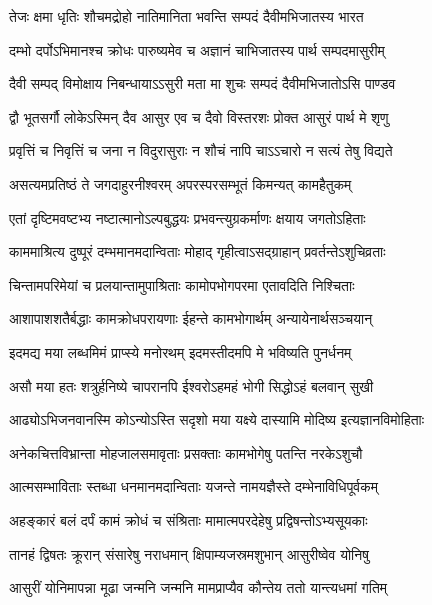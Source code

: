 \twolineshloka
{तेजः क्षमा धृतिः शौचमद्रोहो नातिमानिता}
{भवन्ति सम्पदं दैवीमभिजातस्य भारत}%

\twolineshloka
{दम्भो दर्पोऽभिमानश्च क्रोधः पारुष्यमेव च}
{अज्ञानं चाभिजातस्य पार्थ सम्पदमासुरीम्}%

\twolineshloka
{दैवी सम्पद् विमोक्षाय निबन्धायाऽऽसुरी मता}
{मा शुचः सम्पदं दैवीमभिजातोऽसि पाण्डव}%

\twolineshloka
{द्वौ भूतसर्गौ लोकेऽस्मिन् दैव आसुर एव च}
{दैवो विस्तरशः प्रोक्त आसुरं पार्थ मे शृणु}%

\twolineshloka
{प्रवृत्तिं च निवृत्तिं च जना न विदुरासुराः}
{न शौचं नापि चाऽऽचारो न सत्यं तेषु विद्यते}%

\twolineshloka
{असत्यमप्रतिष्ठं ते जगदाहुरनीश्वरम्}
{अपरस्परसम्भूतं किमन्यत् कामहैतुकम्}%

\twolineshloka
{एतां दृष्टिमवष्टभ्य नष्टात्मानोऽल्पबुद्धयः}
{प्रभवन्त्युग्रकर्माणः क्षयाय जगतोऽहिताः}%

\twolineshloka
{काममाश्रित्य दुष्पूरं दम्भमानमदान्विताः}
{मोहाद् गृहीत्वाऽसद्ग्राहान् प्रवर्तन्तेऽशुचिव्रताः}%

\twolineshloka
{चिन्तामपरिमेयां च प्रलयान्तामुपाश्रिताः}
{कामोपभोगपरमा एतावदिति निश्चिताः}%

\twolineshloka
{आशापाशशतैर्बद्धाः कामक्रोधपरायणाः}
{ईहन्ते कामभोगार्थम् अन्यायेनार्थसञ्चयान्}%

\twolineshloka
{इदमद्य मया लब्धमिमं प्राप्स्ये मनोरथम्}
{इदमस्तीदमपि मे भविष्यति पुनर्धनम्}%

\twolineshloka
{असौ मया हतः शत्रुर्हनिष्ये चापरानपि}
{ईश्वरोऽहमहं भोगी सिद्धोऽहं बलवान् सुखी}%

\twolineshloka
{आढ्योऽभिजनवानस्मि कोऽन्योऽस्ति सदृशो मया}
{यक्ष्ये दास्यामि मोदिष्य इत्यज्ञानविमोहिताः}%

\twolineshloka
{अनेकचित्तविभ्रान्ता मोहजालसमावृताः}
{प्रसक्ताः कामभोगेषु पतन्ति नरकेऽशुचौ}%

\twolineshloka
{आत्मसम्भाविताः स्तब्धा धनमानमदान्विताः}
{यजन्ते नामयज्ञैस्ते दम्भेनाविधिपूर्वकम्}%

\twolineshloka
{अहङ्कारं बलं दर्पं कामं क्रोधं च संश्रिताः}
{मामात्मपरदेहेषु प्रद्विषन्तोऽभ्यसूयकाः}%

\twolineshloka
{तानहं द्विषतः क्रूरान् संसारेषु नराधमान्}
{क्षिपाम्यजस्रमशुभान् आसुरीष्वेव योनिषु}%

\twolineshloka
{आसुरीं योनिमापन्ना मूढा जन्मनि जन्मनि}
{मामप्राप्यैव कौन्तेय ततो यान्त्यधमां गतिम्}%

